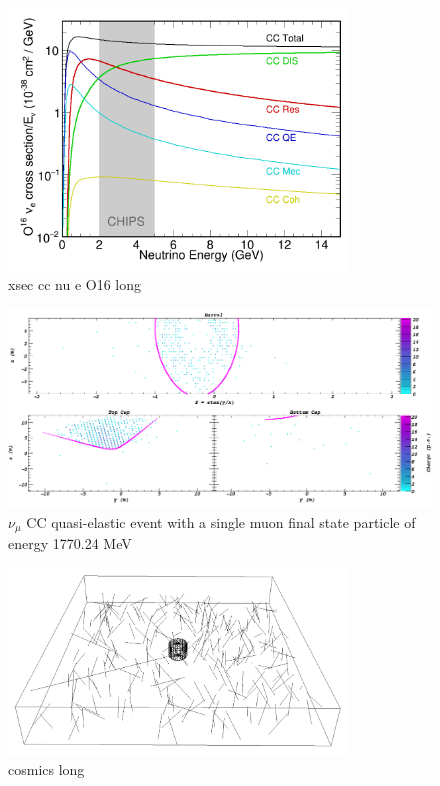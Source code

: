 \begin{figure} %
    \includegraphics[width=0.8\textwidth]{diagrams/4-chips/xsec_cc_nu_e_O16.png}
    \caption[xsec cc nu e O16 short]
    {xsec cc nu e O16 long}
    \label{fig:xsec_cc_nu_e_O16}
\end{figure} %

\begin{figure} %
    \includegraphics[width=\textwidth]{diagrams/4-chips/sim_event.png}
    \caption[sim event short]
    {$\nu_{\mu}$ CC quasi-elastic event with a single muon final state particle of energy 1770.24 MeV}
    \label{fig:sim_event}
\end{figure} %

\begin{figure} %
    \includegraphics[width=0.8\textwidth]{diagrams/4-chips/cosmics.png}
    \caption[cosmics short]
    {cosmics long}
    \label{fig:cosmics}
\end{figure} %

